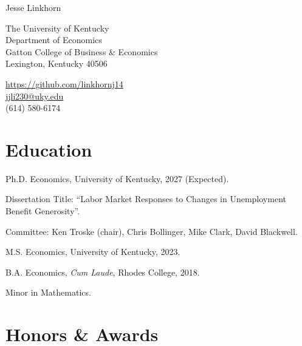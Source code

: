 \documentclass[letterpaper]{article}
\def\name{Jesse Linkhorn}
\renewenvironment{itemize}{
  \begin{list}{}{
    \setlength{\leftmargin}{1.5em}
  }
}{
  \end{list}
}
\begin{document}
{\huge \name}


\vspace{0.25in}
\bigskip
\begin{minipage}[t]{0.495\textwidth}
    The University of Kentucky \\
  Department of Economics \\
  Gatton College of Business \& Economics \\
  Lexington, Kentucky 40506
\end{minipage}
\begin{minipage}[t]{0.495\textwidth}
  \href{https://github.com/linkhornj14/}{https://github.com/linkhornj14} \\
  \href{mailto:jjli230@uky.edu}{jjli230@uky.edu} \\
  (614) 580-6174
\end{minipage}


\section*{Education}

\begin{itemize}
  \item Ph.D. Economics, University of Kentucky, 2027 (Expected).
    \begin{itemize}
    \item Dissertation Title: ``Labor Market Responses to Changes in Unemployment Benefit Generosity''.
    \item Committee: Ken Troske (chair), Chris Bollinger, Mike Clark, David Blackwell.
    \end{itemize}
  \item M.S. Economics, University of Kentucky, 2023.
  \item B.A. Economics, \textit{Cum Laude},
    Rhodes College, 2018.
    \begin{itemize}
    \item Minor in Mathematics.
    \end{itemize}
\end{itemize}


\section*{Honors \& Awards}
\end{document}
